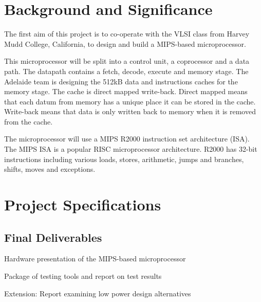 
\section{Background and Significance}

The first aim of this project is to co-operate with the VLSI class
from Harvey Mudd College, California, to design and build a MIPS-based
microprocessor.

This microprocessor will be split into a control unit, a coprocessor and a data path. The datapath contains a fetch, decode, execute and memory stage. The Adelaide team is designing the 512kB data and instructions caches for the memory stage. The cache is direct mapped write-back. Direct mapped means that each datum from memory has a unique place it can be stored in the cache. Write-back means that data is only written back to memory when it is removed from the cache.

The microprocessor will use a MIPS R2000 instruction set architecture (ISA). The MIPS ISA is a popular RISC microprocessor architecture. R2000 has 32-bit instructions including various loads, stores, arithmetic, jumps and branches, shifts, moves and exceptions.

\section{Project Specifications}

\subsection{Final Deliverables}
\begin{enumerate}[{[D}1{]}]
\item Hardware presentation of the MIPS-based microprocessor
\item Package of testing tools and report on test results
\item Extension: Report examining low power design alternatives
\end{enumerate}

